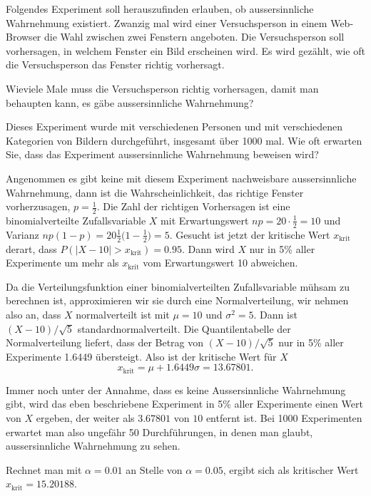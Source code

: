 Folgendes Experiment soll herauszufinden erlauben, ob aussersinnliche
Wahrnehmung existiert.
Zwanzig mal wird einer Versuchsperson in einem Web-Browser die Wahl zwischen
zwei Fenstern angeboten. Die Versuchsperson soll vorhersagen,
in welchem Fenster ein Bild erscheinen wird. Es wird gezählt,
wie oft die Versuchsperson das Fenster richtig vorhersagt.
\begin{teilaufgaben}
\item Wieviele Male muss die Versuchsperson richtig vorhersagen,
damit man behaupten kann, es gäbe aussersinnliche Wahrnehmung?
\item Dieses Experiment wurde mit verschiedenen Personen
und mit verschiedenen Kategorien von Bildern durchgeführt,
insgesamt über 1000 mal. Wie oft erwarten Sie, dass das
Experiment aussersinnliche Wahrnehmung beweisen wird?
\end{teilaufgaben}

\begin{loesung}
\begin{teilaufgaben}
\item Angenommen es gibt keine mit diesem Experiment nachweisbare
aussersinnliche Wahrnehmung, dann ist die Wahrscheinlichkeit, das
richtige Fenster vorherzusagen, $p=\frac12$. Die Zahl der richtigen
Vorhersagen ist eine binomialverteilte Zufallsvariable $X$ mit
Erwartungswert $np=20\cdot\frac12=10$ und Varianz
$np(1-p)=20\frac12\bigl(1-\frac12\bigr)=5$. Gesucht ist jetzt
der kritische Wert $x_{\text{krit}}$ derart, dass
$P(|X-10| > x_{\text{krit}})=0.95$. Dann wird $X$ nur in 5\% aller
Experimente um mehr als $x_{\text{krit}}$ vom Erwartungswert 10 abweichen.

Da die Verteilungsfunktion einer binomialverteilten Zufallsvariable
mühsam zu berechnen ist, approximieren wir sie durch eine Normalverteilung,
wir nehmen also an, dass $X$ normalverteilt ist mit $\mu = 10$
und $\sigma^2=5$. Dann ist $(X-10)/\sqrt{5}$ standardnormalverteilt.
Die Quantilentabelle der Normalverteilung liefert, dass der Betrag
von $(X-10)/\sqrt{5}$
nur in 5\% aller Experimente 1.6449 übersteigt. Also ist der kritische
Wert für $X$
\[
x_{\text{krit}} =  \mu + 1.6449 \sigma =  13.67801.
\]
\item
Immer noch unter der Annahme, dass es keine Aussersinnliche Wahrnehmung
gibt, wird das eben beschriebene Experiment in 5\% aller Experimente
einen Wert von $X$ ergeben, der weiter als $3.67801$ von $10$ entfernt
ist. Bei 1000 Experimenten erwartet man also ungefähr 50 Durchführungen,
in denen man glaubt, aussersinnliche Wahrnehmung zu sehen.
\end{teilaufgaben}
Rechnet man mit $\alpha = 0.01$ an Stelle von $\alpha = 0.05$,
ergibt sich als kritischer Wert $x_{\text{krit}}=15.20188$.
\end{loesung}

